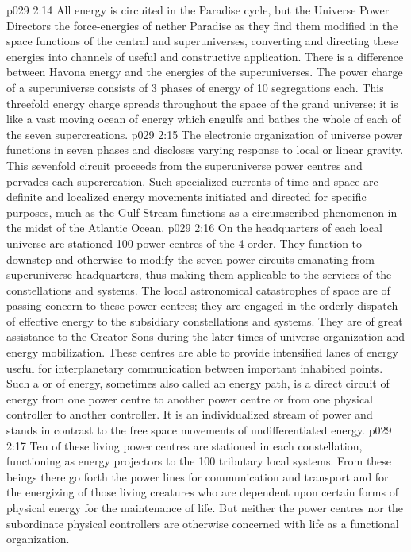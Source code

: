 \vs p029 2:14 All energy is circuited in the Paradise cycle, but the Universe Power Directors  the force\hyp{}energies of nether Paradise as they find them modified in the space functions of the central and superuniverses, converting and directing these energies into channels of useful and constructive application. There is a difference between Havona energy and the energies of the superuniverses. The power charge of a superuniverse consists of 3 phases of energy of 10 segregations each. This threefold energy charge spreads throughout the space of the grand universe; it is like a vast moving ocean of energy which engulfs and bathes the whole of each of the seven supercreations.
\vs p029 2:15 The electronic organization of universe power functions in seven phases and discloses varying response to local or linear gravity. This sevenfold circuit proceeds from the superuniverse power centres and pervades each supercreation. Such specialized currents of time and space are definite and localized energy movements initiated and directed for specific purposes, much as the Gulf Stream functions as a circumscribed phenomenon in the midst of the Atlantic Ocean.
\vs p029 2:16 \bibnobreakspace {} On the headquarters of each local universe are stationed 100 power centres of the 4 order. They function to downstep and otherwise to modify the seven power circuits emanating from superuniverse headquarters, thus making them applicable to the services of the constellations and systems. The local astronomical catastrophes of space are of passing concern to these power centres; they are engaged in the orderly dispatch of effective energy to the subsidiary constellations and systems. They are of great assistance to the Creator Sons during the later times of universe organization and energy mobilization. These centres are able to provide intensified lanes of energy useful for interplanetary communication between important inhabited points. Such a  or  of energy, sometimes also called an energy path, is a direct circuit of energy from one power centre to another power centre or from one physical controller to another controller. It is an individualized stream of power and stands in contrast to the free space movements of undifferentiated energy.
\vs p029 2:17 \bibnobreakspace {} Ten of these living power centres are stationed in each constellation, functioning as energy projectors to the 100 tributary local systems. From these beings there go forth the power lines for communication and transport and for the energizing of those living creatures who are dependent upon certain forms of physical energy for the maintenance of life. But neither the power centres nor the subordinate physical controllers are otherwise concerned with life as a functional organization.
